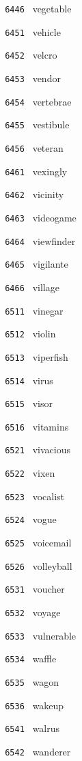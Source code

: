 \documentclass[11pt]{article}
\begin{document}
\begin{multicols}{6}
\noindent \texttt{ 6446 } vegetable  \par
\noindent \texttt{ 6451 } vehicle  \par
\noindent \texttt{ 6452 } velcro  \par
\noindent \texttt{ 6453 } vendor  \par
\noindent \texttt{ 6454 } vertebrae  \par
\noindent \texttt{ 6455 } vestibule  \par
\noindent \texttt{ 6456 } veteran  \par
\noindent \texttt{ 6461 } vexingly  \par
\noindent \texttt{ 6462 } vicinity  \par
\noindent \texttt{ 6463 } videogame  \par
\noindent \texttt{ 6464 } viewfinder  \par
\noindent \texttt{ 6465 } vigilante  \par
\noindent \texttt{ 6466 } village  \par
\noindent \texttt{ 6511 } vinegar  \par
\noindent \texttt{ 6512 } violin  \par
\noindent \texttt{ 6513 } viperfish  \par
\noindent \texttt{ 6514 } virus  \par
\noindent \texttt{ 6515 } visor  \par
\noindent \texttt{ 6516 } vitamins  \par
\noindent \texttt{ 6521 } vivacious  \par
\noindent \texttt{ 6522 } vixen  \par
\noindent \texttt{ 6523 } vocalist  \par
\noindent \texttt{ 6524 } vogue  \par
\noindent \texttt{ 6525 } voicemail  \par
\noindent \texttt{ 6526 } volleyball  \par
\noindent \texttt{ 6531 } voucher  \par
\noindent \texttt{ 6532 } voyage  \par
\noindent \texttt{ 6533 } vulnerable  \par
\noindent \texttt{ 6534 } waffle  \par
\noindent \texttt{ 6535 } wagon  \par
\noindent \texttt{ 6536 } wakeup  \par
\noindent \texttt{ 6541 } walrus  \par
\noindent \texttt{ 6542 } wanderer  \par

\end{multicols}
\end{document}
